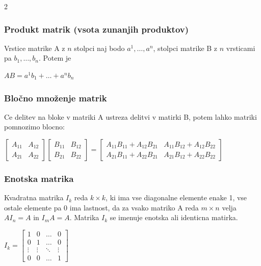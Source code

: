 \documentclass{article}
\begin{document}
\begin{multicols}{2}
	\subsubsection{Produkt matrik (vsota zunanjih produktov)}

	Vrstice matrike A z $n$ stolpci naj bodo
	$a^{1}, \dots, a^{n}$, stolpci matrike B z $n$ vrsticami pa
	$b_{1}, \dots, b_{n}$. Potem je
	\begin{center}
		$AB = a^{1}b_{1} + \dots + a^{n}b_{n}$
	\end{center}

	\subsubsection{Bločno množenje matrik}

	Ce delitev na bloke v matriki A ustreza delitvi v matirki B,
	potem lahko matriki pomnozimo blocno:
	\begin{center}
		$\begin{bmatrix}
				A_{11} & A_{12} \\
				A_{21} & A_{22}
			\end{bmatrix}
			\begin{bmatrix}
				B_{11} & B_{12} \\
				B_{21} & B_{22}
			\end{bmatrix} =
			\begin{bmatrix}
				A_{11}B_{11} + A_{12}B_{21} & A_{11}B_{12} + A_{12}B_{22} \\
				A_{21}B_{11} + A_{22}B_{21} & A_{21}B_{12} + A_{22}B_{22}
			\end{bmatrix}$
	\end{center}

	\subsubsection{Enotska matrika}

	Kvadratna matrika $I_{k}$ reda $k \times k$, ki ima vse diagonalne
	elemente enake 1, vse ostale elemente pa 0 ima lastnost, da za vsako matriko A
	reda $m \times n$ velja $AI_{n} = A$ in $I_{m}A = A$. Matrika $I_{k}$ se imenuje
	enotska ali identicna matirka.
	\begin{center}
		$I_{k}=
			\begin{bmatrix}
				1      & 0      & \hdots & 0      \\
				0      & 1      & \hdots & 0      \\
				\vdots & \vdots & \ddots & \vdots \\
				0      & 0      & \hdots & 1
			\end{bmatrix}
		$
	\end{center}


\end{multicols}
\end{document}
